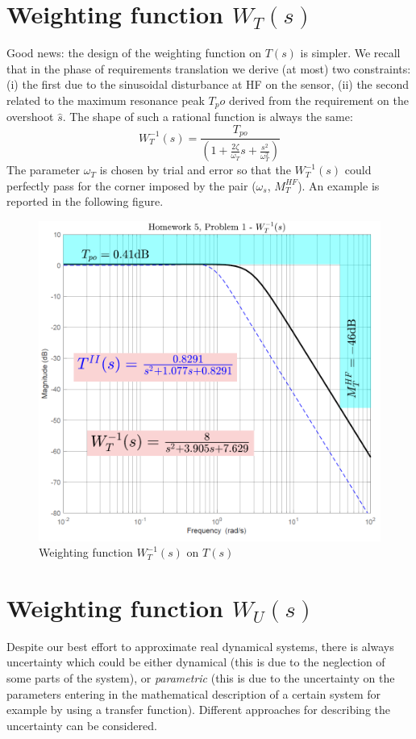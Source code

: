 \documentclass[a4paper, 12pt]{article}
\begin{document}
    \section{Weighting function $W_T(s)$}
    Good news: the design of the weighting function on $T(s)$ is simpler. We recall that in the phase of requirements translation we derive (at most) two constraints: (i) the first due to the sinusoidal disturbance at HF on the sensor, (ii) the second related to the maximum resonance peak $T_po$ derived from the requirement on the overshoot $\hat{s}$. The shape of such a rational function is always the same: 
    \begin{equation}
        W_T^{-1}(s) = \frac{T_{po}}{{(1+\frac{2\zeta}{\omega_T}s+\frac{s^2}{\omega_T^2})}}
    \end{equation}
    The parameter $\omega_T$ is chosen by trial and error so that the $W_T^{-1}(s)$ could perfectly pass for the corner imposed by the pair ($\omega_s$, $M_T^{HF}$). 
    An example is reported in the following figure.

    \begin{figure}[h]
        \centering
        \includegraphics[scale=0.7]{img/Wt.png}
        \caption{Weighting function $W_T^{-1}(s)$ on $T(s)$}
    \end{figure}
    
    \section{Weighting function $W_U(s)$}
    Despite our best effort to approximate real dynamical systems, there is always uncertainty which could be either dynamical (this is due to the neglection of some parts of the system), or \textit{parametric} (this  is due to the uncertainty on the parameters entering in the mathematical description of a certain system for example by using a transfer function). Different approaches for describing the uncertainty can be considered.
\end{document}

